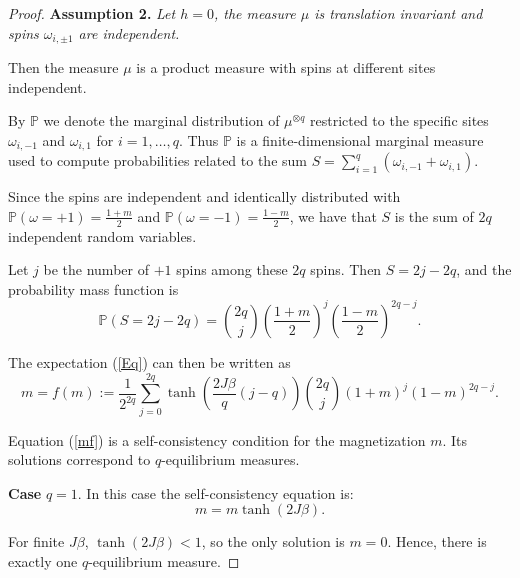 \documentclass[10pt,a4paper]{amsart}
\begin{document}
\begin{proof}
{\bf Assumption 2.} {\it Let $h=0$, the measure $\mu$ is translation invariant and spins $\omega_{i,\pm 1}$ are independent.} 

Then the measure $ \mu $ is a product measure with spins at different sites independent. 

By $\mathbb{P}$ we denote  the marginal distribution of $\mu^{\otimes q}$ restricted to the specific sites $\omega_{i,-1}$ and $\omega_{i,1}$ for $i = 1, \dots, q$. Thus
$\mathbb{P}$ is a finite-dimensional marginal measure used to compute probabilities related to the sum  $ S = \sum_{i=1}^q (\omega_{i,-1} + \omega_{i,1}) $. 

Since the spins are independent and identically distributed with $ \mathbb{P}(\omega = +1) = \frac{1 + m}{2} $ and $ \mathbb{P}(\omega = -1) = \frac{1 - m}{2} $, we have that $ S $ is the sum of $ 2q $ independent random variables. 

Let $ j $ be the number of $ +1 $ spins among these $ 2q $ spins. Then $ S = 2j - 2q $, and the probability mass function is
$$
\mathbb{P}(S = 2j - 2q) = \binom{2q}{j} \left( \frac{1 + m}{2} \right)^j \left( \frac{1 - m}{2} \right)^{2q - j}.
$$

The expectation (\ref{Eq}) can then be written as
\begin{equation}\label{mf}
m = f(m):=\frac{1}{2^{2q}} \sum_{j=0}^{2q} \tanh\left( \frac{2 J\beta}{q} (j - q) \right) \binom{2q}{j} (1 + m)^j (1 - m)^{2q - j}.
\end{equation}

Equation (\ref{mf}) is a self-consistency condition for the magnetization $ m $. Its solutions correspond to $ q $-equilibrium measures.

{\bf  Case} $ q = 1 $. In this case 
the self-consistency equation is:
$$
m = m \tanh(2J\beta).
$$

For finite $ J\beta $, $ \tanh(2J\beta) < 1 $, so the only solution is $ m = 0 $. Hence, there is exactly one $ q $-equilibrium measure.


\end{proof}
\end{document}
